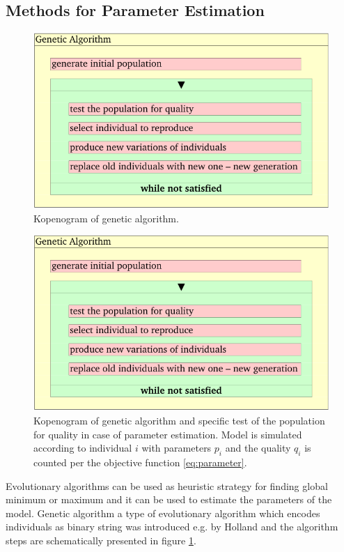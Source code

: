 \subsection{Methods for Parameter Estimation}
\label{sec:methodsestimation}

\begin{figure}[htb]
    \centering
    \includegraphics[page=1]{chapter3/GA-kopenogram-crop.pdf}    
    \caption{Kopenogram of genetic algorithm. 
    }
    \label{fig:GA-kopenogram}
\end{figure}
\begin{figure}[htb]
    \centering
    \includegraphics[page=2]{chapter3/GA-kopenogram-crop.pdf}    
    \caption{Kopenogram of genetic algorithm and specific test of the population for quality in case of parameter estimation. Model is simulated according to individual $i$ with parameters $p_i$ and the quality $q_i$ is counted per the objective function \ref{eq:parameter}.
    }
    \label{fig:GA-kopenogram2}
\end{figure}
Evolutionary algorithms can be used as heuristic strategy for finding global minimum or maximum and it can be used to estimate the parameters of the model. Genetic algorithm a type of evolutionary algorithm which encodes individuals as binary string was introduced e.g. by Holland\cite{Holland1975} and the algorithm steps are schematically presented in figure \ref{fig:GA-kopenogram}.

